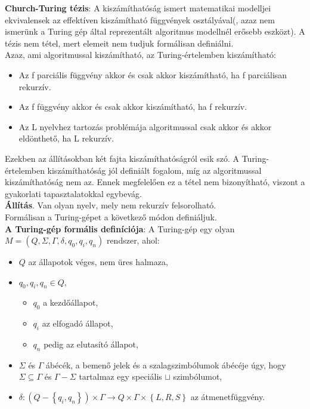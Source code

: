 \documentclass[tikz,12pt,margin=0px]{article}
\begin{document}
    \noindent \textbf{Church-Turing tézis}: A kiszámíthatóság ismert matematikai modelljei ekvivalensek az effektíven kiszámítható függvények osztályával(, azaz nem ismerünk a Turing gép által reprezentált algoritmus modellnél erősebb eszközt). A tézis nem tétel, mert elemeit nem tudjuk formálisan definiálni.\\
	
    \noindent Azaz, ami algoritmussal kiszámítható, az Turing-értelemben kiszámítható:
    \begin{itemize}
        \item Az f parciális függvény akkor és csak akkor kiszámítható, ha f parciálisan rekurzív.
        \item Az f függvény akkor és csak akkor kiszámítható, ha f rekurzív.
        \item Az L nyelvhez tartozás problémája algoritmussal csak akkor és akkor eldönthető, ha L rekurzív.
    \end{itemize}

    \noindent Ezekben az állításokban két fajta kiszámíthatóságról esik szó. A Turing-értelemben kiszámíthatóság jól definiált fogalom, míg az algoritmussal kiszámíthatóság nem az. Ennek megfelelően ez a tétel nem bizonyítható, viszont a gyakorlati tapasztalatokkal egybevág.\\

    \noindent \textbf{Állítás}. Van olyan nyelv, mely nem rekurzív felsorolható.\\
\newpage
    \noindent Formálisan a Turing-gépet a következő módon definiáljuk. \\
	
	\noindent \textbf{A Turing-gép formális definíciója}: A Turing-gép egy olyan
	$M = (Q, \Sigma, \Gamma, \delta, q_{0}, q_{i}, q_{n})$ rendszer, ahol:
	
	\begin{itemize}
		
		\item	$Q$ az állapotok véges, nem üres halmaza,
		
		\item	$q_{0}, q_{i}, q_{n} \in Q$,
        \begin{itemize}
            \item $q_{0}$ a kezdőállapot,
            \item $q_{i}$ az elfogadó állapot,
            \item $q_{n}$ pedig az elutasító állapot,
        \end{itemize}
		
		\item	$\Sigma$ és $\Gamma$ ábécék, a bemenő jelek és a szalagszimbólumok ábécéje úgy, hogy
		$\Sigma \subseteq \Gamma$ és $\Gamma - \Sigma$ tartalmaz egy speciális $\boldsymbol{\sqcup}$ szimbólumot,
		
		\item	$\delta : (Q - \left\{q_{i},q_{n}\right\}) \times \Gamma \to Q \times \Gamma \times \left\{L, R, S\right\}$
		az átmenetfüggvény.

	\end{itemize}
	
\end{document}
